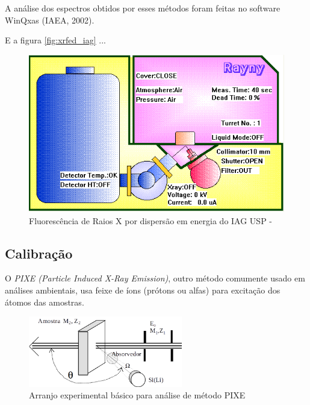 
A análise dos espectros obtidos por esses métodos foram feitas no software WinQxas (IAEA, 2002).


E a figura \ref{fig:xrfed_iag} ...

\begin{figure}[H]
\begin{center}
  \includegraphics[scale=0.4]{../inputs/images/edx_iag_monitor.png}
  \caption{Fluorescência de Raios X por dispersão em energia do IAG USP - \label{fig:xrfed_software}}
\end{center}
\end{figure}

\subsection{Calibração}

O \textit{PIXE (Particle Induced X-Ray Emission)}, 
outro método comumente usado em análises ambientais, usa feixe de íons 
(prótons ou alfas) para excitação dos átomos das amostras.

\begin{figure}[H]
\begin{center} 
  \includegraphics[width=0.6\textwidth]{../inputs/images/arranjopixe.png}
  \caption{Arranjo experimental básico para análise de método PIXE 
           \cite{tabacniks2000} \label{fig:arranjopixe}}
\end{center}
\end{figure}

